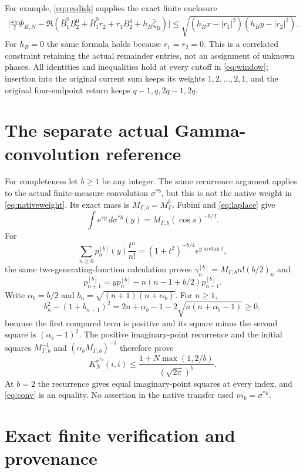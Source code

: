 \documentclass[11pt]{article}
\begin{document}
For example, \eqref{eq:resdisk} supplies the exact finite enclosure
\begin{equation}\label{eq:currentdisk}
 \begin{split}
 \Big|\frac{\omega_N}2\Phi_{B,N}
 -\Re(\bar B_1^0B_2^0+\bar B_1^0r_2+\bar r_1B_2^0
                   +h_B\bar\zeta_B)\Big|
 \le\sqrt{(h_Bx-|r_1|^2)(h_By-|r_2|^2)}.
 \end{split}
\end{equation}
For $h_B=0$ the same formula holds because $r_1=r_2=0$.
This is a correlated constraint retaining the actual remainder entries,
not an assignment of unknown phases.  All identities and inequalities
hold at every cutoff in \eqref{eq:window}; insertion into the original
current sum keeps its weights $1,2,\ldots,2,1$, and the original
four-endpoint return keeps $q-1,q,2q-1,2q$.

\section{The separate actual Gamma-convolution reference}

For completeness let $b\ge1$ be any integer.  The same recurrence
argument applies to the actual finite-measure convolution $\sigma^{*b}$,
but this is not the native weight in \eqref{eq:nativeweight}.  Its exact
mass is $M_{\Gamma,b}=M_\Gamma^b$.  Fubini and \eqref{eq:laplace} give
\[
 \int e^{sy}\,d\sigma^{*b}(y)=M_{\Gamma,b}(\cos s)^{-b/2}.
\]
For
\[
 \sum_{n\ge0}p_n^{[b]}(y)\frac{t^n}{n!}
 =(1+t^2)^{-b/4}e^{y\arctan t},
\]
the same two-generating-function calculation proves
$\gamma_n^{[b]}=M_{\Gamma,b}n!(b/2)_n$ and
\[
 p_{n+1}^{[b]}=yp_n^{[b]}-n(n-1+b/2)p_{n-1}^{[b]}.
\]
Write $\alpha_b=b/2$ and $b_n=\sqrt{(n+1)(n+\alpha_b)}$.
For $n\ge1$,
\[
 b_n^2-(1+b_{n-1})^2
 =2n+\alpha_b-1-2\sqrt{n(n+\alpha_b-1)}\ge0,
\]
because the first compared term is positive and its square minus the
second square is $(\alpha_b-1)^2$.  The positive imaginary-point
recurrence and the initial squares $M_{\Gamma,b}^{-1}$ and
$(\alpha_bM_{\Gamma,b})^{-1}$ therefore prove
\begin{equation}\label{eq:conv}
 K_N^{\sigma^{*b}}(i,i)
 \le\frac{1+N\max(1,2/b)}{(\sqrt{2\pi})^b}.
\end{equation}
At $b=2$ the recurrence gives equal imaginary-point squares at every
index, and \eqref{eq:conv} is an equality.  No assertion in the native
transfer used $m_k=\sigma^{*k}$.

\section{Exact finite verification and provenance}
\end{document}
